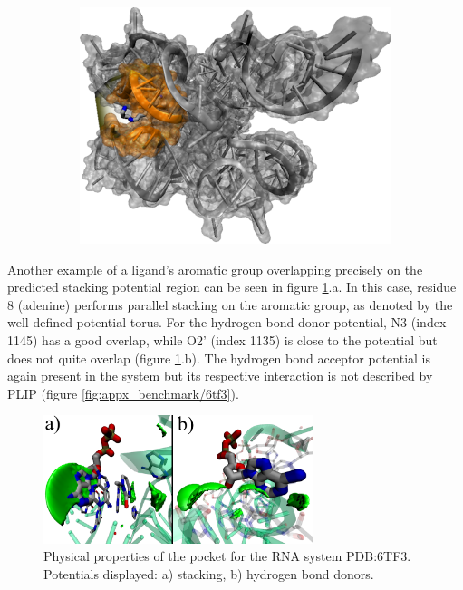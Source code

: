       \begin{figure}[H] \centering
        \begin{subfigure}[c]{0.3\textwidth} \centering
          \includegraphics[width=1\textwidth]{figures/results/ps_rna/7oax0.png}
        \end{subfigure}
        \begin{subfigure}[c]{0.3\textwidth} \centering
        \end{subfigure}
      \end{figure}

      Another example of a ligand's aromatic group overlapping precisely on the predicted stacking potential region can be seen in figure \ref{fig:benchmark/6tf3}.a. In this case, residue 8 (adenine) performs parallel stacking on the aromatic group, as denoted by the well defined potential torus. For the hydrogen bond donor potential, N3 (index 1145) has a good overlap, while O2' (index 1135) is close to the potential but does not quite overlap (figure \ref{fig:benchmark/6tf3}.b). The hydrogen bond acceptor potential is again present in the system but its respective interaction is not described by PLIP (figure \ref{fig:appx_benchmark/6tf3}).

      \begin{figure}[H]
        \centering
        \includegraphics[width=0.7\textwidth]{figures/results/benchmark_rna/6tf3.png}
        \caption{\label{fig:benchmark/6tf3} Physical properties of the pocket for the RNA system PDB:6TF3. Potentials displayed: a) stacking, b) hydrogen bond donors.}
      \end{figure}
    \pagebreak

